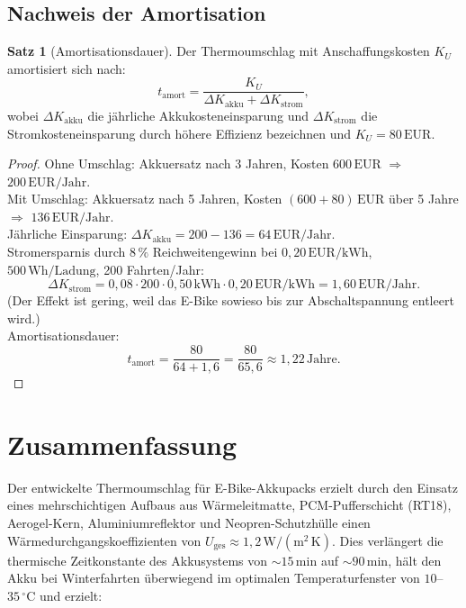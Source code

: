 ﻿\documentclass[a4paper,12pt]{article}
\theoremstyle{definition}
\newtheorem{satz}{Satz}
\begin{document}
\subsection{Nachweis der Amortisation}

\begin{satz}[Amortisationsdauer]
\label{satz:amortisation}
Der Thermoumschlag mit Anschaffungskosten $K_U$ amortisiert sich nach:
\[
  t_\mathrm{amort} = \frac{K_U}{\Delta K_\mathrm{akku} + \Delta K_\mathrm{strom}},
\]
wobei $\Delta K_\mathrm{akku}$ die j\"ahrliche Akkukosteneinsparung und $\Delta K_\mathrm{strom}$ die Stromkosteneinsparung durch h\"ohere Effizienz bezeichnen und $K_U = 80\,\text{EUR}$.
\end{satz}

\begin{proof}
Ohne Umschlag: Akkuersatz nach 3 Jahren, Kosten $600\,\text{EUR}$ $\Rightarrow$ $200\,\text{EUR}/\text{Jahr}$.\\
Mit Umschlag: Akkuersatz nach 5 Jahren, Kosten $(600 + 80)\,\text{EUR}$ \"uber 5 Jahre $\Rightarrow$ $136\,\text{EUR}/\text{Jahr}$.\\
J\"ahrliche Einsparung: $\Delta K_\mathrm{akku} = 200 - 136 = 64\,\text{EUR}/\text{Jahr}$.\\
Stromersparnis durch $8\,\%$ Reichweitengewinn bei $0{,}20\,\text{EUR}/\mathrm{kWh}$, $500\,\text{Wh/Ladung}$, 200 Fahrten/Jahr:
\[
  \Delta K_\mathrm{strom} = 0{,}08 \cdot 200 \cdot 0{,}50\,\text{kWh} \cdot 0{,}20\,\text{EUR}/\text{kWh} = 1{,}60\,\text{EUR}/\text{Jahr}.
\]
(Der Effekt ist gering, weil das E-Bike sowieso bis zur Abschaltspannung entleert wird.)\\
Amortisationsdauer:
\[
  t_\mathrm{amort} = \frac{80}{64 + 1{,}6} = \frac{80}{65{,}6} \approx 1{,}22\,\text{Jahre}.
\]
\end{proof}

\section{Zusammenfassung}

Der entwickelte Thermoumschlag f\"ur E-Bike-Akkupacks erzielt durch den Einsatz eines mehrschichtigen Aufbaus aus Wärmeleitmatte, PCM-Pufferschicht (RT18), Aerogel-Kern, Aluminiumreflektor und Neopren-Schutzhülle einen W\"armedurchgangskoeffizienten von $U_\mathrm{ges} \approx 1{,}2\,\mathrm{W/(m^2\,K)}$. Dies verl\"angert die thermische Zeitkonstante des Akkusystems von $\sim 15\,\mathrm{min}$ auf $\sim 90\,\mathrm{min}$, h\"alt den Akku bei Winterfahrten \"uberwiegend im optimalen Temperaturfenster von $10$--$35\,{}^\circ\mathrm{C}$ und erzielt:
\end{document}
